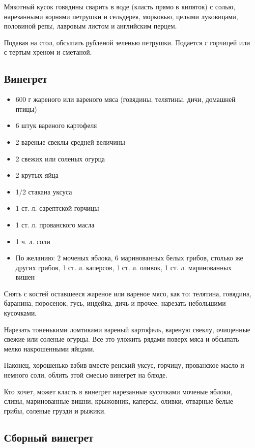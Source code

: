 Мякотный кусок говядины сварить в воде (класть прямо в кипяток) с солью, нарезанными корнями петрушки и сельдерея, морковью, целыми луковицами, половиной репы, лавровым листом и английским перцем.

Подавая на стол, обсыпать рубленой зеленью петрушки. Подается с горчицей или с тертым хреном и сметаной.

\subsection{Винегрет}

\begin{itemize}
	\item 600 г жареного или вареного мяса (говядины, телятины, дичи, домашней птицы)
    \item 6 штук вареного картофеля
    \item 2 вареные свеклы средней величины 
    \item 2 свежих или соленых огурца 
    \item 2 крутых яйца 
    \item 1/2 стакана уксуса 
    \item 1 ст. л. сарептской горчицы
    \item 1 ст. л. прованского масла 
    \item 1 ч. л. соли 
    \item По желанию: 2 моченых яблока, 6 маринованных белых грибов, столько же других грибов, 1 ст. л. каперсов, 1 ст. л. оливок, 1 ст. л. маринованных вишен
\end{itemize}

Снять с костей оставшееся жареное или вареное мясо, как то: телятина, говядина, баранина, поросенок, гусь, индейка, дичь и прочее, нарезать небольшими кусочками.

Нарезать тоненькими ломтиками вареный картофель, вареную свеклу, очищенные свежие или соленые огурцы. Все это уложить рядами поверх мяса и обсыпать мелко накрошенными яйцами.

Наконец, хорошенько взбив вместе ренский уксус, горчицу, прованское масло и немного соли, облить этой смесью винегрет на блюде.

Кто хочет, может класть в винегрет нарезанные кусочками моченые яблоки, сливы, маринованные вишни, крыжовник, каперсы, оливки, отварные белые грибы, соленые грузди и рыжики.

\subsection{Сборный винегрет}\label{5vinegret}

